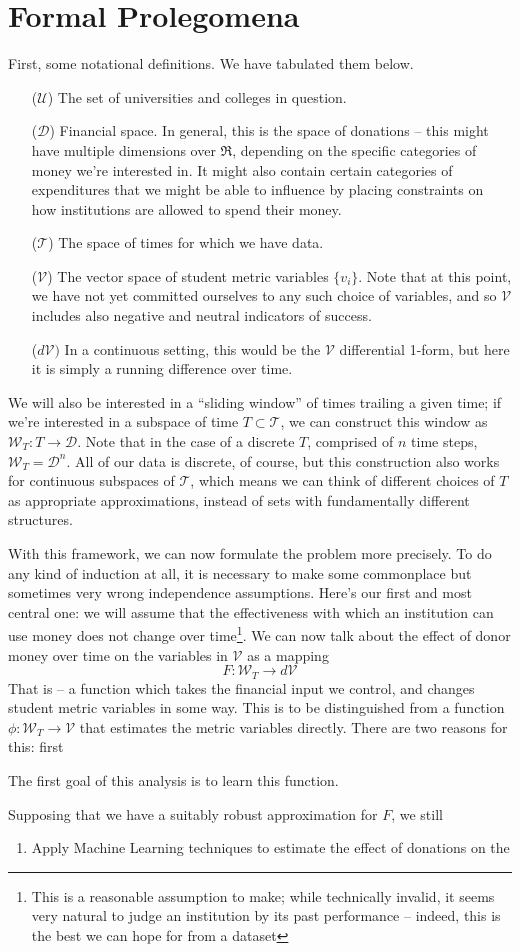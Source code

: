 \documentclass[paper.tex]{subfiles}
\newcommand{\U}{\mathcal{U}}
\newcommand{\D}{\mathcal{D}}
\newcommand{\V}{\mathcal{V}}
\newcommand{\T}{\mathcal{T}}
\newcommand{\W}{\mathcal{W}}
\begin{document}
	\section{Formal Prolegomena}
	
	First, some notational definitions. We have tabulated them below. 
	
	\begin{itemize}
		\item[($\U$)] The set of universities and colleges in question.
		\item[($\D$)] Financial space. In general, this is the space of donations -- this might have multiple dimensions over $\Re$, depending on the specific categories of money we're interested in. It might also contain certain categories of expenditures that we might be able to influence by placing constraints on how institutions are allowed to spend their money.  
		\item[($\T$)] The space of times for which we have data. 
		\item[($\V$)] The vector space of student metric variables $\{v_i\}$. Note that at this point, we have not yet committed ourselves to any such choice of variables, and so $\V$ includes also negative and neutral indicators of success.
		\item[($d\V)$] In a continuous setting, this would be the $\V$ differential 1-form, but here it is simply a running difference over time.  
	\end{itemize}
		
	We will also be interested in a ``sliding window'' of times trailing a given time; if we're interested in a subspace of time $T \subset \T$, we can construct this window as $\W_T : T  \to \D$. Note that in the case of a discrete $T$, comprised of $n$ time steps, $\W_T = \D^n$. All of our data is discrete, of course, but this construction also works for continuous subspaces of $\T$, which means we can think of different choices of $T$ as appropriate approximations, instead of sets with fundamentally different structures.
	
	With this framework, we can now formulate the problem more precisely. To do any kind of induction at all, it is necessary to make some commonplace but sometimes very wrong independence assumptions. Here's our first and most central one: we will assume that the effectiveness with which an institution can use money does not change over time\footnote{This is a reasonable assumption to make; while technically invalid, it seems very natural to judge an institution by its past performance -- indeed, this is the best we can hope for from a dataset}. We can now talk about the effect of donor money over time on the variables in $\V$ as a mapping
	\begin{equation}
		F: \W_T \to d\V
	\end{equation} 	
	That is -- a function which takes the financial input we control, and changes student metric variables in some way. This is to be distinguished from a function $\phi: \W_T \to \V$ that estimates the metric variables directly. There are two reasons for this: first
	
	The first goal of this analysis is to learn this function. 
	
	Supposing that we have a suitably robust approximation for $F$, we still 
	
	\begin{enumerate}
		\item Apply Machine Learning techniques to estimate the effect of donations on the 
	\end{enumerate}
\end{document}
